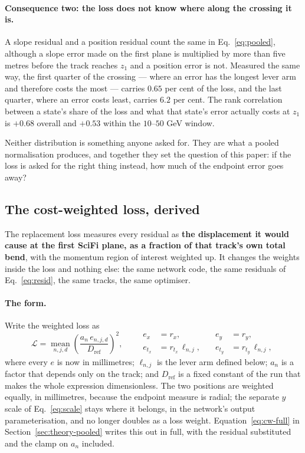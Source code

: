 \documentclass[11pt,a4paper]{article}
\begin{document}
\paragraph{Consequence two: the loss does not know where along the crossing it
is.} A slope residual and a position residual count the same in
Eq.~\eqref{eq:pooled}, although a slope error made on the first plane is
multiplied by more than five metres before the track reaches $z_1$ and a
position error is not. Measured the same way, the first quarter of the
crossing --- where an error has the longest lever arm and therefore costs the
most --- carries $0.65$ per cent of the loss, and the last quarter, where an
error costs least, carries $6.2$ per cent. The rank correlation between a
state's share of the loss and what that state's error actually costs at $z_1$
is $+0.68$ overall and $+0.53$ within the $10$--$50$ GeV window.

Neither distribution is something anyone asked for. They are what a pooled
normalisation produces, and together they set the question of this paper: if
the loss is asked for the right thing instead, how much of the endpoint error
goes away?

\subsection{The cost-weighted loss, derived}
\label{sec:theory-costweighted}

The replacement loss measures every residual as \textbf{the displacement it
would cause at the first SciFi plane, as a fraction of that track's own total
bend}, with the momentum region of interest weighted up. It changes the
weights inside the loss and nothing else: the same network code, the same
residuals of Eq.~\eqref{eq:resid}, the same tracks, the same optimiser.

\paragraph{The form.} Write the weighted loss as
%
\begin{equation}
  \mathcal{L}
    = \operatorname*{mean}_{n,j,d}
      \left(\frac{a_n\, e_{n,j,d}}{D_{\mathrm{ref}}}\right)^{\!2},
  \qquad
  \begin{aligned}
    e_{x} &= r_{x}, &\quad e_{y} &= r_{y},\\
    e_{t_x} &= r_{t_x}\,\ell_{n,j}, &\quad e_{t_y} &= r_{t_y}\,\ell_{n,j},
  \end{aligned}
  \label{eq:lossF}
\end{equation}
%
where every $e$ is now in millimetres; $\ell_{n,j}$ is the lever arm defined
below; $a_n$ is a factor that depends only on the track; and
$D_{\mathrm{ref}}$ is a fixed constant of the run that makes the whole
expression dimensionless. The two positions are weighted equally, in
millimetres, because the endpoint measure is radial; the separate $y$ scale of
Eq.~\eqref{eq:scale} stays where it belongs, in the network's output
parameterisation, and no longer doubles as a loss weight.
Equation~\eqref{eq:cw-full} in Section~\ref{sec:theory-pooled} writes this out
in full, with the residual substituted and the clamp on $a_n$ included.
\end{document}
